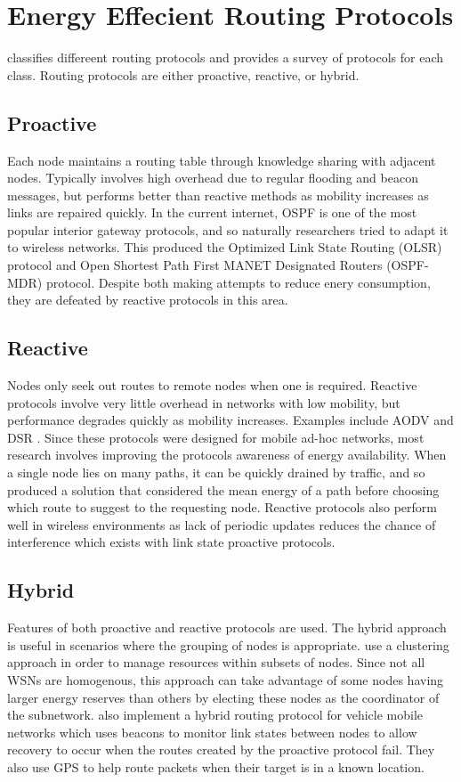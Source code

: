 \documentclass[12pt]{article}
\begin{document}
\section{Energy Effecient Routing Protocols}

\cite{hassan} classifies differeent routing protocols and provides a survey of protocols for each class. Routing protocols are either proactive, reactive, or hybrid. 

\subsection{Proactive} 
Each node maintains a routing table through knowledge sharing with adjacent nodes. Typically involves high overhead due to regular flooding and beacon messages, but performs better than reactive methods as mobility increases as links are repaired quickly. In the current internet, OSPF is one of the most popular interior gateway protocols, and so naturally researchers tried to adapt it to wireless networks. This produced the Optimized Link State Routing (OLSR) protocol \cite{olsr} and Open Shortest Path First MANET Designated Routers (OSPF-MDR) protocol. Despite both making attempts to reduce enery consumption, they are defeated by reactive protocols in this area. 

\subsection{Reactive} 
Nodes only seek out routes to remote nodes when one is required. Reactive protocols involve very little overhead in networks with low mobility, but performance degrades quickly as mobility increases. Examples include AODV \cite{aodv} and DSR \cite{dsr}. Since these protocols were designed for mobile ad-hoc networks, most research involves improving the protocols awareness of energy availability. When a single node lies on many paths, it can be quickly drained by traffic, and so \cite{eaodv} produced a solution that considered the mean energy of a path before choosing which route to suggest to the requesting node. 
Reactive protocols also perform well in wireless environments as lack of periodic updates reduces the chance of interference which exists with link state proactive protocols.

\subsection{Hybrid} 
Features of both proactive and reactive protocols are used. The hybrid approach is useful in scenarios where the grouping of nodes is appropriate. \cite{cluster} use a clustering approach in order to manage resources within subsets of nodes. Since not all WSNs are homogenous, this approach can take advantage of some nodes having larger energy reserves than others by electing these nodes as the coordinator of the subnetwork. \cite{vanet} also implement a hybrid routing protocol for vehicle mobile networks which uses beacons to monitor link states between nodes to allow recovery to occur when the routes created by the proactive protocol fail. They also use GPS to help route packets when their target is in a known location.
\end{document}
